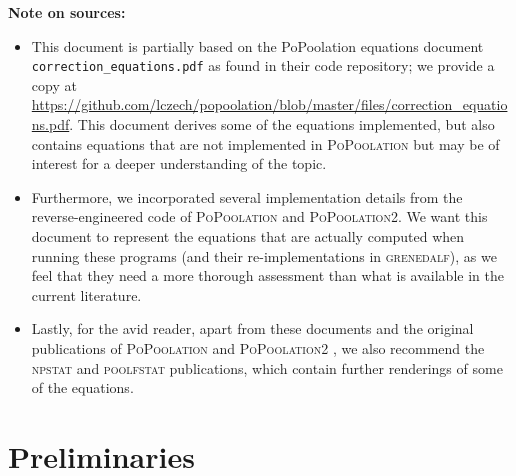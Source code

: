\documentclass[a4paper,fontsize=9pt,DIV=14]{scrartcl}
\newcounter{todo}
\newcommand\todo[1]{}
\newcommand\citeay[1]{\citeauthor{#1} (\citeyear{#1}) \cite{#1}}
\newcommand\toolname{\textsc}
\begin{document}
\pagebreak

\tableofcontents

\vspace*{5em}
\textbf{Note on sources:}
\begin{itemize}
    \item This document is partially based on the PoPoolation equations document \texttt{correction\_equations.pdf} as found in their code repository; we provide a copy at \url{https://github.com/lczech/popoolation/blob/master/files/correction_equations.pdf}. This document derives some of the equations implemented, but also contains equations that are not implemented in \toolname{PoPoolation} but may be of interest for a deeper understanding of the topic.
    \item Furthermore, we incorporated several implementation details from the reverse-engineered code of \toolname{PoPoolation} and \toolname{PoPoolation2}. We want this document to represent the equations that are actually computed when running these programs (and their re-implementations in \toolname{grenedalf}), as we feel that they need a more thorough assessment than what is available in the current literature.
    \item Lastly, for the avid reader, apart from these documents and the original publications of \toolname{PoPoolation} \cite{Kofler2011a} and \toolname{PoPoolation2} \cite{Kofler2011b}, we also recommend the \toolname{npstat} \cite{Ferretti2013} and \toolname{poolfstat} \cite{Hivert2018,Gautier2022-zd} publications, which contain further renderings of some of the equations.
\end{itemize}

\pagebreak


\section{Preliminaries}
\label{supp:sec:Definitions}


\end{document}
